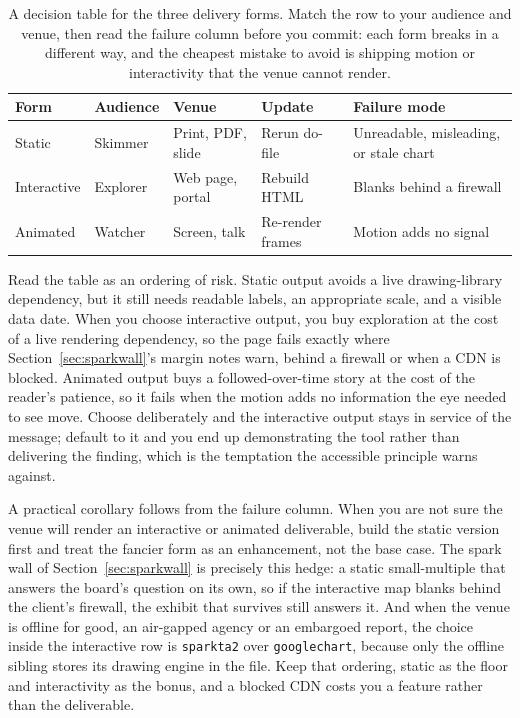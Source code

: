 \begin{table}[htbp]
\centering
\caption[Choosing static, interactive, or animated]{A decision table for the three delivery forms. Match the row to your audience and venue, then read the failure column before you commit: each form breaks in a different way, and the cheapest mistake to avoid is shipping motion or interactivity that the venue cannot render.}
\label{tab:interactive-choice}
{\footnotesize
\begin{tabular}{@{}llllp{6.0cm}@{}}
\hline
Form & Audience & Venue & Update & Failure mode \\
\hline
Static & Skimmer & Print, PDF, slide & Rerun do-file & Unreadable, misleading, or stale chart \\
Interactive & Explorer & Web page, portal & Rebuild HTML & Blanks behind a firewall \\
Animated & Watcher & Screen, talk & Re-render frames & Motion adds no signal \\
\hline
\end{tabular}
}
\end{table}

Read the table as an ordering of risk. Static output avoids a live drawing-library dependency, but it still needs readable labels, an appropriate scale, and a visible data date. When you choose interactive output, you buy exploration at the cost of a live rendering dependency, so the page fails exactly where Section~\ref{sec:sparkwall}'s margin notes warn, behind a firewall or when a CDN is blocked. Animated output buys a followed-over-time story at the cost of the reader's patience, so it fails when the motion adds no information the eye needed to see move. Choose deliberately and the interactive output stays in service of the message; default to it and you end up demonstrating the tool rather than delivering the finding, which is the temptation the accessible principle warns against.

A practical corollary follows from the failure column. When you are not sure the venue will render an interactive or animated deliverable, build the static version first and treat the fancier form as an enhancement, not the base case. The spark wall of Section~\ref{sec:sparkwall} is precisely this hedge: a static small-multiple that answers the board's question on its own, so if the interactive map blanks behind the client's firewall, the exhibit that survives still answers it. And when the venue is offline for good, an air-gapped agency or an embargoed report, the choice inside the interactive row is \texttt{sparkta2} over \texttt{googlechart}, because only the offline sibling stores its drawing engine in the file. Keep that ordering, static as the floor and interactivity as the bonus, and a blocked CDN costs you a feature rather than the deliverable.

